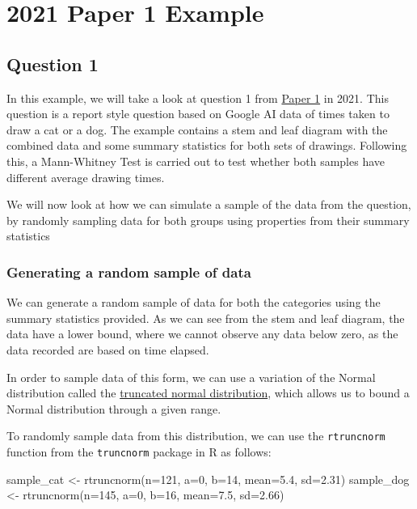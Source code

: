 \documentclass[
]{book}
\newenvironment{Shaded}{\begin{snugshade}}{\end{snugshade}}
\newcommand{\AttributeTok}[1]{\textcolor[rgb]{0.77,0.63,0.00}{#1}}
\newcommand{\DecValTok}[1]{\textcolor[rgb]{0.00,0.00,0.81}{#1}}
\newcommand{\FloatTok}[1]{\textcolor[rgb]{0.00,0.00,0.81}{#1}}
\newcommand{\FunctionTok}[1]{\textcolor[rgb]{0.00,0.00,0.00}{#1}}
\newcommand{\NormalTok}[1]{#1}
\newcommand{\OtherTok}[1]{\textcolor[rgb]{0.56,0.35,0.01}{#1}}
\begin{document}
\hypertarget{paper-1-example}{%
\chapter{2021 Paper 1 Example}\label{paper-1-example}}

\hypertarget{question-1}{%
\section{Question 1}\label{question-1}}

In this example, we will take a look at question 1 from \href{https://www.sqa.org.uk/sqa/files_ccc/NAH_Statistics_Paper1_2021.pdf}{Paper 1} in 2021. This question is a report style question based on Google AI data of times taken to draw a cat or a dog. The example contains a stem and leaf diagram with the combined data and some summary statistics for both sets of drawings. Following this, a Mann-Whitney Test is carried out to test whether both samples have different average drawing times.

We will now look at how we can simulate a sample of the data from the question, by randomly sampling data for both groups using properties from their summary statistics

\hypertarget{generating-a-random-sample-of-data}{%
\subsection{Generating a random sample of data}\label{generating-a-random-sample-of-data}}

We can generate a random sample of data for both the categories using the summary statistics provided. As we can see from the stem and leaf diagram, the data have a lower bound, where we cannot observe any data below zero, as the data recorded are based on time elapsed.

In order to sample data of this form, we can use a variation of the Normal distribution called the \href{https://en.wikipedia.org/wiki/Truncated_normal_distribution}{truncated normal distribution}, which allows us to bound a Normal distribution through a given range.

To randomly sample data from this distribution, we can use the \texttt{rtruncnorm} function from the \texttt{truncnorm} package in R as follows:

\begin{Shaded}
\begin{Highlighting}[]
\NormalTok{sample\_cat }\OtherTok{\textless{}{-}} \FunctionTok{rtruncnorm}\NormalTok{(}\AttributeTok{n=}\DecValTok{121}\NormalTok{, }\AttributeTok{a=}\DecValTok{0}\NormalTok{, }\AttributeTok{b=}\DecValTok{14}\NormalTok{, }\AttributeTok{mean=}\FloatTok{5.4}\NormalTok{, }\AttributeTok{sd=}\FloatTok{2.31}\NormalTok{)}
\NormalTok{sample\_dog }\OtherTok{\textless{}{-}} \FunctionTok{rtruncnorm}\NormalTok{(}\AttributeTok{n=}\DecValTok{145}\NormalTok{, }\AttributeTok{a=}\DecValTok{0}\NormalTok{, }\AttributeTok{b=}\DecValTok{16}\NormalTok{, }\AttributeTok{mean=}\FloatTok{7.5}\NormalTok{, }\AttributeTok{sd=}\FloatTok{2.66}\NormalTok{)}
\end{Highlighting}
\end{Shaded}
\end{document}
